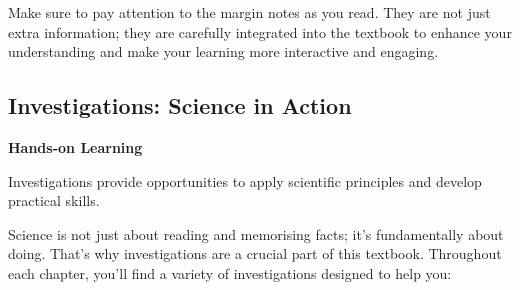 Make sure to pay attention to the margin notes as you read. They are not just extra information; they are carefully integrated into the textbook to enhance your understanding and make your learning more interactive and engaging.

\subsection{Investigations: Science in Action}

\begin{marginnote}
\textbf{Hands-on Learning}

Investigations provide opportunities to apply scientific principles and develop practical skills.
\end{marginnote}
Science is not just about reading and memorising facts; it’s fundamentally about doing.  That’s why investigations are a crucial part of this textbook.  Throughout each chapter, you’ll find a variety of investigations designed to help you:

